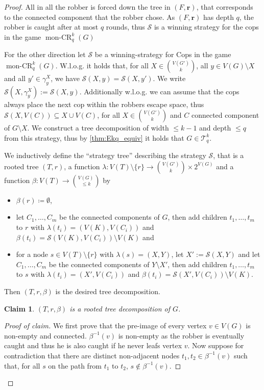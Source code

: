 \documentclass[10pt,a4paper]{article}
\newtheorem{claim}[theorem]{Claim}
\newcommand{\Ekq}{\ensuremath{\mathcal{T}_{q}^{k}}}
\DeclareMathOperator{\monCR}{mon-CR}
\renewcommand{\vec}[1]{\ensuremath{\boldsymbol{#1}}}
\newenvironment{claimproof}{\begin{proof}[Proof of claim]}{\end{proof}}
\begin{document}
\begin{proof}
	All in all the robber is forced down the tree in $(F,\vec{r})$, that corresponds to the connected component that the robber chose. As $(F,\vec{r})$ has depth $q$, the robber is caught after at most $q$ rounds, thus $\mathcal{S}$ is a winning strategy for the cops in the game $\monCR_q^k(G)$
	
	For the other direction let $\mathcal{S}$ be a winning-strategy for Cops in the game $\monCR_q^k(G)$.
	W.l.o.g. it holds that, for all $X\in\binom{V(G')}{k}$, all $y\in V(G)\setminus X$ and all $y'\in \gamma_y^X$, we have $\mathcal{S}(X,y)=\mathcal{S}(X,y')$.
	We write $\mathcal{S}(X,\gamma_y^X):=\mathcal{S}(X,y)$.
	Additionally w.l.o.g. we can assume that the cops always place the next cop within the robbers escape space, thus $\mathcal{S}(X,V(C))\subseteq X\cup V(C)$, for all $X\in\binom{V(G')}{k}$ and $C$ connected component of $G\setminus X$.
	We construct a tree decomposition of width $\leq k-1$ and depth $\leq q$ from this strategy, thus by \cref{thm:Ekq_equiv} it holds that $G\in\Ekq$.
	
	We inductively define the ``strategy tree'' describing the strategy $\mathcal{S}$, that is a rooted tree $(T,r)$, a function $\lambda\colon V(T)\setminus\{r\}\to \binom{V(G')}{k}\times 2^{V(G)}$ and a function $\beta\colon V(T)\rightarrow \binom{V(G)}{\leq k}$ by
	\begin{itemize}
		\item $\beta(r)\coloneqq \emptyset$,
		\item let $C_1,\ldots,C_m$ be the connected components of $G$, then add children $t_1,\ldots,t_m$ to $r$ with $\lambda(t_i)=(V(K),V(C_i))$ and $\beta(t_i)=\mathcal{S}(V(K),V(C_i))\setminus V(K)$ and
		\item for a node $s\in V(T)\setminus\{r\}$ with $\lambda(s)=(X,Y)$, let $X':=\mathcal{S}(X,Y)$ and let $C_1,\ldots,C_m$ be the connected components of $Y\setminus X'$, then add children $t_1,\ldots,t_m$ to $s$ with $\lambda(t_i)=(X',V(C_i))$ and $\beta(t_i)=\mathcal{S}(X',V(C_i))\setminus V(K)$.
	\end{itemize}
	Then $(T,r,\beta)$ is the desired tree decomposition. 

	\begin{claim}
		$(T,r,\beta)$ is a rooted tree decomposition of $G$.
	\end{claim}
	
	\begin{claimproof}
		We first prove that the pre-image of every vertex $v\in V(G)$ is non-empty and connected.
		$\beta^{-1}(v)$ is non-empty as the robber is eventually caught and thus he is also caught if he never leafs vertex $v$.
		Now suppose for contradiction that there are distinct non-adjacent nodes $t_1,t_2\in\beta^{-1}(v)$ such that, for all $s$ on the path from $t_1$ to $t_2$, $s\not\in\beta^{-1}(v)$.
		

\end{claimproof}
\end{proof}
\end{document}
